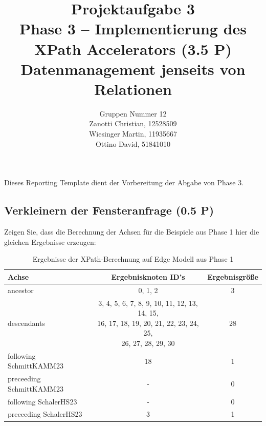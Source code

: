 \documentclass[11pt]{scrartcl}
\title{
  \textbf{\large Projektaufgabe 3 } \\
  Phase 3 – Implementierung des XPath Accelerators (3.5 P) \\
  {\large Datenmanagement jenseits von Relationen}
}
\author{
  Gruppen Nummer 12 \\
  \large Zanotti Christian, 12528509 \\
  \large Wiesinger Martin, 11935667 \\
  \large Ottino David, 51841010 
}
\begin{document}
\maketitle\thispagestyle{empty}

Dieses Reporting Template dient der Vorbereitung der Abgabe von Phase 3. 

\subsection*{Verkleinern der Fensteranfrage (0.5 P)}

Zeigen Sie, dass die Berechnung der Achsen für die Beispiele aus Phase 1 hier die gleichen Ergebnisse erzeugen:

\begin{table}[h]
	\centering
		\begin{center}
			\begin{tabular}{ l | c c }
				\toprule
				Achse & Ergebnisknoten ID's & Ergebnisgröße\\
				\midrule
				ancestor & 0, 1, 2 & 3 \\ 
				descendants &
\makecell[l]{3, 4, 5, 6, 7, 8, 9, 10, 11, 12, 13, 14, 15, \\
16, 17, 18, 19, 20, 21, 22, 23, 24, 25, \\
26, 27, 28, 29, 30}
& 28 \\  
				following SchmittKAMM23& 18 & 1 \\  
				preceeding SchmittKAMM23 & - & 0 \\ 
				following SchalerHS23& - & 0 \\  
				preceeding SchalerHS23& 3 & 1 \\ 
				\bottomrule
			\end{tabular}
			\end{center}
	\caption{Ergebnisse der XPath-Berechnung auf Edge Modell aus Phase 1}
	\label{tab:ErgebnisseDerXPathBerechnug}
\end{table}
\end{document}
